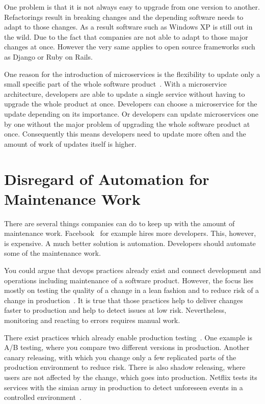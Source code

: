 One problem is that it is not always easy to upgrade from one version to
another. Refactorings result in breaking changes and the depending software needs to adapt
to those changes. As a result software such as Windows XP is still out in the wild. Due to
the fact that companies are not able to adapt to those major changes at once. However the
very same applies to open source frameworks such as Django or Ruby on Rails.

One reason for the introduction of microservices is the flexibility to update only a small
specific part of the whole software product~\cite{microservices_fowler}. With a
microservice architecture, developers are able to update a single service without having
to upgrade the whole product at once. Developers can choose a microservice for the update
depending on its importance. Or developers can update microservices one by one without the
major problem of upgrading the whole software product at once. Consequently this means
developers need to update more often and the amount of work of updates itself is higher.

\section{Disregard of Automation for Maintenance Work}

There are several things companies can do to keep up with the amount of maintenance
work. Facebook~\cite{dev_at_fb} for example hires more developers. This, however, is
expensive. A much better solution is automation. Developers should automate some of the
maintenance work.

You could argue that devops practices already exist and connect development and operations
including maintenance of a software product. However, the focus lies mostly on testing the
quality of a change in a lean fashion and to reduce risk of a change in
production~\cite{devops_definition}. It is true that those practices help to deliver
changes faster to production and help to detect issues at low risk. Nevertheless,
monitoring and reacting to errors requires manual work.

There exist practices which already enable production testing~\cite{dev_at_fb}. One
example is A/B testing, where you compare two different versions in production. Another
canary releasing, with which you change only a few replicated parts of the production
environment to reduce risk. There is also shadow releasing, where users are not affected
by the change, which goes into production. Netflix tests its services with the simian army
in production to detect unforeseen events in a controlled
environment~\cite{antifragile_org}.

